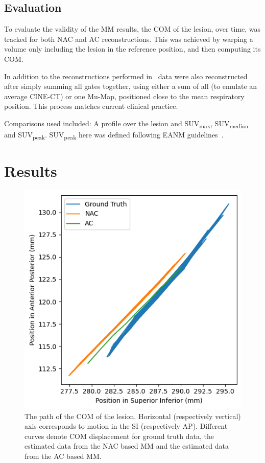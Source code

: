     
    \subsection{Evaluation} \label{sec:evaluation}
        To evaluate the validity of the \gls{MM} results, the \gls{COM} of the lesion, over time, was tracked for both \gls{NAC} and \gls{AC} reconstructions. This was achieved by warping a volume only including the lesion in the reference position, and then computing its \gls{COM}.
        
        In addition to the reconstructions performed in~ data were also reconstructed after simply summing all gates together, using either a sum of all  (to emulate an average CINE-CT) or one \gls{Mu-Map}, positioned close to the mean respiratory position. This process matches current clinical practice. 
        
        Comparisons used included: A profile over the lesion and \gls{SUV}\textsubscript{max}, \gls{SUV}\textsubscript{median} and \gls{SUV}\textsubscript{peak}. \gls{SUV}\textsubscript{peak} here was defined following \gls{EANM} guidelines~\cite{Boellaard2015FDG2.0}.


\section{Results} \label{sec:results}
    \begin{figure}
        \centering
        \includegraphics[width=0.75\linewidth]{figures/com.png}
        \captionsetup{singlelinecheck=false, justification=centering}
        \caption{The path of the \gls{COM} of the lesion. Horizontal (respectively vertical) axis corresponds to motion in the \gls{SI} (respectively \gls{AP}). Different curves denote \gls{COM} displacement for  ground truth data, the estimated data from the \gls{NAC} based \gls{MM} and the estimated data from the \gls{AC} based \gls{MM}.}
        \label{fig:com}
    \end{figure}
    
